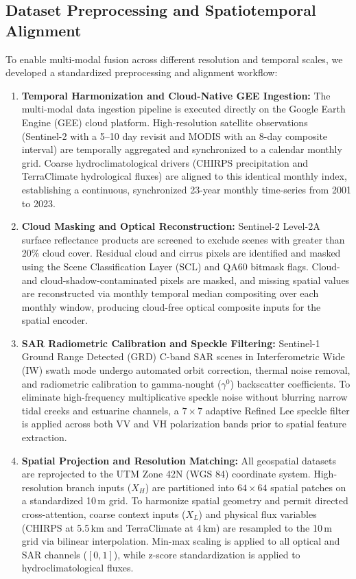 \documentclass[preprint,12pt]{elsarticle}
\begin{document}
\subsection{Dataset Preprocessing and Spatiotemporal Alignment}
To enable multi-modal fusion across different resolution and temporal scales, we developed a standardized preprocessing and alignment workflow:
\begin{enumerate}
    \item \textbf{Temporal Harmonization and Cloud-Native GEE Ingestion:} The multi-modal data ingestion pipeline is executed directly on the Google Earth Engine (GEE) cloud platform. High-resolution satellite observations (Sentinel-2 with a 5--10 day revisit and MODIS with an 8-day composite interval) are temporally aggregated and synchronized to a calendar monthly grid. Coarse hydroclimatological drivers (CHIRPS precipitation and TerraClimate hydrological fluxes) are aligned to this identical monthly index, establishing a continuous, synchronized 23-year monthly time-series from 2001 to 2023.
    \item \textbf{Cloud Masking and Optical Reconstruction:} Sentinel-2 Level-2A surface reflectance products are screened to exclude scenes with greater than 20\% cloud cover. Residual cloud and cirrus pixels are identified and masked using the Scene Classification Layer (SCL) and QA60 bitmask flags. Cloud- and cloud-shadow-contaminated pixels are masked, and missing spatial values are reconstructed via monthly temporal median compositing over each monthly window, producing cloud-free optical composite inputs for the spatial encoder.
    \item \textbf{SAR Radiometric Calibration and Speckle Filtering:} Sentinel-1 Ground Range Detected (GRD) C-band SAR scenes in Interferometric Wide (IW) swath mode undergo automated orbit correction, thermal noise removal, and radiometric calibration to gamma-nought ($\gamma^0$) backscatter coefficients. To eliminate high-frequency multiplicative speckle noise without blurring narrow tidal creeks and estuarine channels, a $7 \times 7$ adaptive Refined Lee speckle filter is applied across both VV and VH polarization bands prior to spatial feature extraction.
    \item \textbf{Spatial Projection and Resolution Matching:} All geospatial datasets are reprojected to the UTM Zone 42N (WGS 84) coordinate system. High-resolution branch inputs ($X_H$) are partitioned into $64 \times 64$ spatial patches on a standardized 10\,m grid. To harmonize spatial geometry and permit directed cross-attention, coarse context inputs ($X_L$) and physical flux variables (CHIRPS at 5.5\,km and TerraClimate at 4\,km) are resampled to the 10\,m grid via bilinear interpolation. Min-max scaling is applied to all optical and SAR channels ($[0, 1]$), while z-score standardization is applied to hydroclimatological fluxes.
\end{enumerate}
\end{document}
